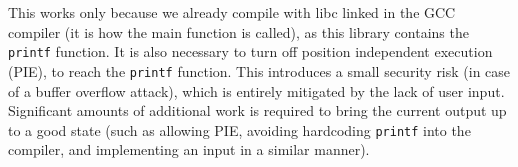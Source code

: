 This works only because we already compile with libc linked in the GCC compiler (it
is how the main function is called), as this library contains the \texttt{printf} function.
It is also necessary to turn off position independent execution (PIE), to reach the
\texttt{printf} function. This introduces a small security risk (in case of a buffer
overflow attack), which is entirely mitigated by the lack of user input. Significant
amounts of additional work is required to bring the current output up to a good state
(such as allowing PIE, avoiding hardcoding \texttt{printf} into the compiler, and implementing an input in a similar manner).

